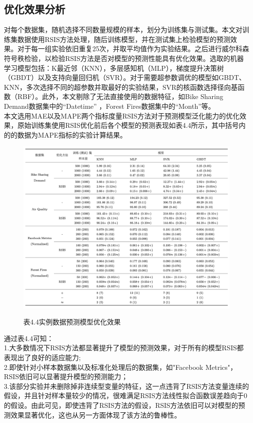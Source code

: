 \documentclass{NauThesis}
\begin{document}
\subsection{优化效果分析}
对每个数据集，随机选择不同数量规模的样本，划分为训练集与测试集。本文对训练集数据使用RSIS方法处理，随后训练模型，并在测试集上检验模型的预测效果。对于每一组实验依旧重复25次，并取平均值作为实验结果。之后进行威尔科森符号秩检验，以检验RSIS方法是否对模型的预测性能具有优化效果。选取的机器学习模型包括：K最近邻（KNN），多层感知机（MLP），梯度提升决策树（GBDT）以及支持向量回归机（SVR）。对于需要超参数调优的模型如GBDT、KNN，多次选择不同的超参数并取最好的实验结果，SVR的核函数选择径向基函数（RBF）。此外，本文剔除了无法直接使用的数据特征，如Bike Sharing Demand数据集中的“Datetime” ，Forest Fires数据集中的“Month”等。
\\\hspace*{2em}本文选用MAE以及MAPE两个指标度量RSIS方法对于预测模型泛化能力的优化效果，原始训练集使用RSIS优化前后各个模型的预测表现如表4.4所示，其中括号内的的数据为MAPE指标的实验计算结果。
\\
\begin{figure}[htbp]
    \centering
    \caption*{表4.4\;实例数据预测模型优化效果}
    \includegraphics[width=1.0\textwidth]{figs/tab4.png}
    \label{tab4}
\end{figure}
\newpage
通过表4.4可知：
\\\hspace*{2em}1.大多数情况下RSIS方法都显著提升了模型的预测效果，对于所有的模型RSIS都表现出了良好的适应能力;
\\\hspace*{2em}2.即使针对小样本数据集以及标准化处理后的数据集，如"Facebook Metrics"，RSIS依旧可以显著提升模型的预测能力；
\\\hspace*{2em}3.该部分实验并未删除掉非连续型变量的特征，这一点违背了RSIS方法变量连续的假设，并且针对样本量较少的情况，很难满足RSIS方法线性拟合函数误差趋向于0的假设。由此可见，即使违背了RSIS方法的假设，RSIS方法依旧可以对模型的预测效果显著优化，这也从另一方面体现了该方法的鲁棒性。
\end{document}
